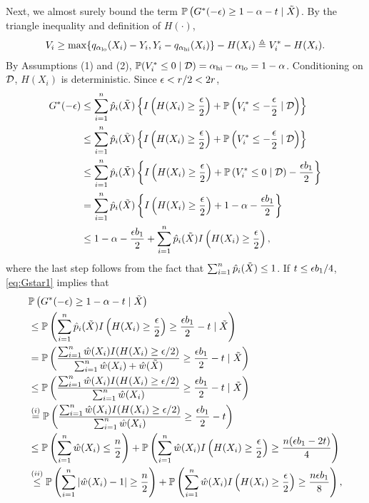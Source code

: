 ~\\
\noindent Next, we almost surely bound the term
$\mathbb{P}\left( G^{*}(-\epsilon)\ge 1 - \alpha - t \mid \tilde{X}\right)$. By the triangle
inequality and definition of $H(\cdot)$,
\[V_{i}\ge \max\{q_{\alpha_{\mathrm{lo}}}(X_{i}) - Y_{i}, Y_{i} - q_{\alpha_{\mathrm{hi}}}(X_{i})\} - H(X_{i})\triangleq V_{i}^{*} - H(X_{i}).\]
By Assumptions (1) and (2), $\mathbb{P}(V_{i}^{*}\le 0\mid \mathcal{D}) = \alpha_{\mathrm{hi}} - \alpha_{\mathrm{lo}} = 1 - \alpha$. Conditioning on $\mathcal{D}$, $H(X_{i})$ is deterministic. Since $\epsilon < r / 2 < 2r$,
\begin{align}
  G^{*}(-\epsilon)
  &\le \sum_{i=1}^{n}\hat{p}_{i}(\tilde{X})\left\{ I\left( H(X_{i})\ge \frac{\epsilon}{2}\right) + \mathbb{P}\left( V_{i}^{*}\le -\frac{\epsilon}{2}\mid \mathcal{D}\right)\right\}\nonumber\\
  & \le \sum_{i=1}^{n}\hat{p}_{i}(\tilde{X})\left\{ I\left( H(X_{i})\ge \frac{\epsilon}{2}\right) + \mathbb{P}\left( V_{i}^{*}\le -\frac{\epsilon}{2}\mid \mathcal{D}\right)\right\}\nonumber\\
  & \le \sum_{i=1}^{n}\hat{p}_{i}(\tilde{X})\left\{ I\left( H(X_{i})\ge \frac{\epsilon}{2}\right) + \mathbb{P}\left( V_{i}^{*}\le 0\mid \mathcal{D}\right) - \frac{\epsilon b_{1}}{2}\right\}\nonumber\\
  & = \sum_{i=1}^{n}\hat{p}_{i}(\tilde{X})\left\{ I\left( H(X_{i})\ge \frac{\epsilon}{2}\right) + 1 - \alpha - \frac{\epsilon b_{1}}{2}\right\}\nonumber\\
  & \le 1 - \alpha - \frac{\epsilon b_{1}}{2} + \sum_{i=1}^{n}\hat{p}_{i}(\tilde{X})I\left( H(X_{i})\ge \frac{\epsilon}{2}\right),\label{eq:Gstar1}
\end{align}
where the last step follows from the fact that $\sum_{i=1}^{n}\hat{p}_{i}(\tilde{X})\le 1$. If $t \le \epsilon b_1 / 4$, \eqref{eq:Gstar1} implies that 
\begin{align*}
  &\mathbb{P}\left( G^{*}(-\epsilon)\ge 1 - \alpha - t \mid \tilde{X}\right)\\
  & \le \mathbb{P}\left(\sum_{i=1}^{n}\hat{p}_{i}(\tilde{X})I\left( H(X_i)\ge \frac{\epsilon}{2}\right)\ge \frac{\epsilon b_1}{2} - t\mid \tilde{X}\right)\\
  & = \mathbb{P}\left(\frac{\sum_{i=1}^{n}\hat{w}(X_i)I(H(X_i)\ge \epsilon / 2)}{\sum_{i=1}^{n}\hat{w}(X_i) + \hat{w}(\tilde{X})}\ge \frac{\epsilon b_1}{2} - t\mid \tilde{X}\right)\\
  & \le \mathbb{P}\left(\frac{\sum_{i=1}^{n}\hat{w}(X_i)I(H(X_i)\ge \epsilon / 2)}{\sum_{i=1}^{n}\hat{w}(X_i)}\ge \frac{\epsilon b_1}{2} - t\mid \tilde{X}\right)\\
  & \stackrel{(i)}{=} \mathbb{P}\left(\frac{\sum_{i=1}^{n}\hat{w}(X_i)I(H(X_i)\ge \epsilon / 2)}{\sum_{i=1}^{n}\hat{w}(X_i)}\ge \frac{\epsilon b_1}{2} - t\right)\\
  & \le \mathbb{P}\left(\sum_{i=1}^{n}\hat{w}(X_i)\le \frac{n}{2}\right) + \mathbb{P}\left( \sum_{i=1}^{n}\hat{w}(X_i)I\left( H(X_i)\ge \frac{\epsilon}{2}\right)\ge \frac{n(\epsilon b_1 - 2t)}{4}\right)\\
  & \stackrel{(ii)}{\le} \mathbb{P}\left(\sum_{i=1}^{n}|\hat{w}(X_i) - 1|\ge \frac{n}{2}\right) + \mathbb{P}\left( \sum_{i=1}^{n}\hat{w}(X_i)I\left( H(X_i)\ge \frac{\epsilon}{2}\right)\ge \frac{n\epsilon b_1}{8}\right),
\end{align*}

